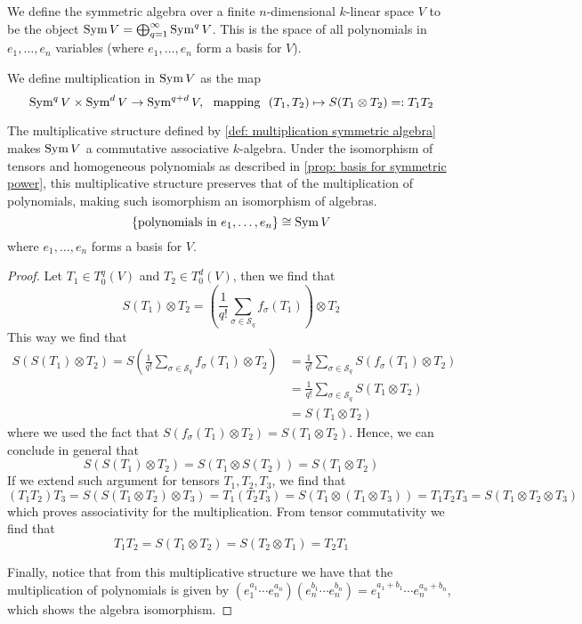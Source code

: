 \begin{definition}
  We define the symmetric algebra over a finite \(n\)-dimensional \(k\)-linear
  space \(V\) to be the object \(\operatorname{Sym} V = \bigoplus_{q=1}^\infty \operatorname{Sym}^q V\).
  This is the space of all polynomials in \(e_1, \dots, e_n\) variables (where
  \(e_1, \dots, e_n\) form a basis for \(V\)).

  We define multiplication in \(\operatorname{Sym} V\) as the map
  \begin{equation}\label{def: multiplication symmetric algebra}
    \operatorname{Sym}^q V \times \operatorname{Sym}^d V \to \operatorname{Sym}^{q + d} V,\ \text{ mapping }\
    (T_1, T_2) \mapsto S(T_1 \otimes T_2) =: T_1 T_2
  \end{equation}
\end{definition}

\begin{proposition}
  The multiplicative structure defined by \cref{def: multiplication symmetric
  algebra} makes \(\operatorname{Sym} V\) a commutative associative \(k\)-algebra. Under the
  isomorphism of tensors and homogeneous polynomials as described in
  \cref{prop: basis for symmetric power}, this multiplicative structure
  preserves that of the multiplication of polynomials, making such isomorphism
  an isomorphism of algebras.
  \[
    \{\text{polynomials in } e_1, \dots, e_n\} \cong \operatorname{Sym} V
  \] 
  where \(e_1, \dots, e_n\) forms a basis for \(V\).
\end{proposition}

\begin{proof}
  Let \(T_1 \in T_0^q(V)\) and \(T_2 \in T_0^d(V)\), then we find that
  \[
    S(T_1) \otimes T_2 = \left( \frac{1}{q!} \sum_{\sigma \in \mathcal S_q}
    f_\sigma(T_1) \right) \otimes T_2
  \] 
  This way we find that
  \begin{align*}
    S(S(T_1) \otimes T_2) = S \left( \frac{1}{q!} \sum_{\sigma \in \mathcal S_q}
    f_\sigma(T_1) \otimes T_2 \right)
    &= \frac{1}{q!} \sum_{\sigma \in \mathcal S_q} S(f_\sigma(T_1) \otimes T_2)
    \\
    &= \frac{1}{q!} \sum_{\sigma \in \mathcal S_q} S(T_1 \otimes T_2) \\
    &= S(T_1 \otimes T_2)
  \end{align*}
  where we used the fact that \(S(f_\sigma(T_1) \otimes T_2) = S(T_1 \otimes
  T_2)\). Hence, we can conclude in general that
  \[
    S(S(T_1) \otimes T_2) = S(T_1 \otimes S(T_2)) = S(T_1 \otimes T_2)
  \] 
  If we extend such argument for tensors \(T_1, T_2, T_3\), we find that
  \[
    (T_1 T_2) T_3 = S(S(T_1 \otimes T_2) \otimes T_3)
    = T_1 (T_2 T_3) = S(T_1 \otimes (T_1 \otimes T_3))
    = T_1 T_2 T_3 = S(T_1 \otimes T_2 \otimes T_3)
  \] 
  which proves associativity for the multiplication. From tensor commutativity
  we find that 
  \[
    T_1 T_2 = S(T_1 \otimes T_2) = S(T_2 \otimes T_1) = T_2 T_1
  \]

  Finally, notice that from this multiplicative structure we have that the
  multiplication of polynomials is given by \((e_1^{a_1} \cdots
  e_n^{a_n}) (e_n^{b_1} \cdots e_n^{b_n}) = e_1^{a_1 + b_1} \cdots e_n^{a_n +
  b_n}\), which shows the algebra isomorphism.
\end{proof}
